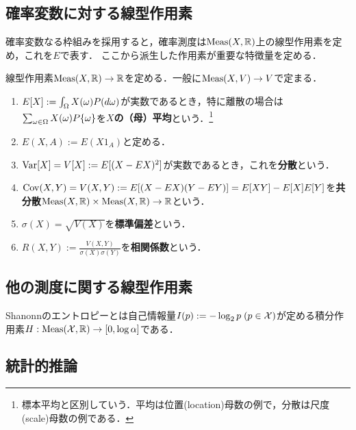 \documentclass[uplatex,dvipdfmx]{jsreport}
\begin{document}
\subsection{確率変数に対する線型作用素}

\begin{tcolorbox}[colframe=ForestGreen, colback=ForestGreen!10!white,breakable,colbacktitle=ForestGreen!40!white,coltitle=black,fonttitle=\bfseries\sffamily,
title=]
    確率変数なる枠組みを採用すると，確率測度は$\mathrm{Meas}(X,\mathbb{R})$上の線型作用素を定め，これを$E$で表す．
    ここから派生した作用素が重要な特徴量を定める．
\end{tcolorbox}

\begin{definition}
    線型作用素$\mathrm{Meas}(X,\mathbb{R})\to\mathbb{R}$を定める．一般に$\mathrm{Meas}(X,V)\to V$で定まる．
    \begin{enumerate}
        \item $E[X]:=\int_\Omega X(\omega)P(d\omega)$が実数であるとき，特に離散の場合は$\sum_{\omega\in\Omega}X(\omega)P\{\omega\}$を\textbf{$X$の（母）平均}という．\footnote{標本平均と区別していう．平均は位置(location)母数の例で，分散は尺度(scale)母数の例である．}
        \item $E(X,A):=E(X1_A)$と定める．
        \item $\mathrm{Var}[X]=V[X]:=E[(X-EX)^2]$が実数であるとき，これを\textbf{分散}という．
        \item $\mathrm{Cov}(X,Y)=V(X,Y):=E[(X-EX)(Y-EY)]=E[XY]-E[X]E[Y]$を\textbf{共分散}$\mathrm{Meas}(X,\mathbb{R})\times\mathrm{Meas}(X,\mathbb{R})\to\mathbb{R}$という．
        \item $\sigma(X)=\sqrt{V(X)}$を\textbf{標準偏差}という．
        \item $R(X,Y):=\frac{V(X,Y)}{\sigma(X)\sigma(Y)}$を\textbf{相関係数}という．
    \end{enumerate}
\end{definition}

\subsection{他の測度に関する線型作用素}

\begin{definition}[entropy]
    Shanonnのエントロピーとは自己情報量$I(p):=-\log_2p\;(p\in\mathcal{X})$が定める積分作用素$H:\mathrm{Meas}(\mathcal{X},\mathbb{R})\to[0,\log\alpha]$である．
\end{definition}

\subsection{統計的推論}
\end{document}

